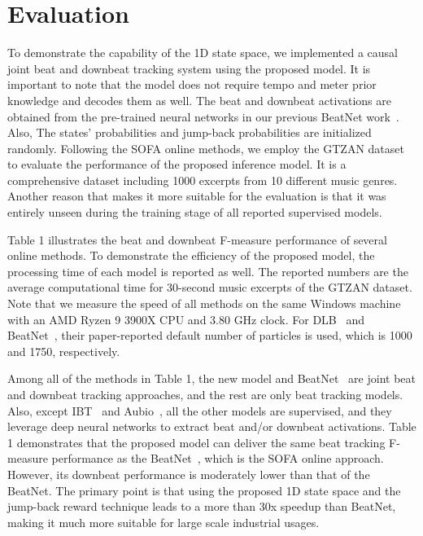 \documentclass{article}
\begin{document}
\section{Evaluation}
\label{sec:pagestyle}

To demonstrate the capability of the 1D state space, we implemented a causal joint beat and downbeat tracking system using the proposed model. It is important to note that the model does not require tempo and meter prior knowledge and decodes them as well. The beat and downbeat activations are obtained from the pre-trained neural networks in our previous BeatNet work~\cite{Heydari:2}. Also, The states' probabilities and jump-back probabilities are initialized randomly. 
Following the SOFA online methods, we employ the GTZAN dataset to evaluate the performance of the proposed inference model. It is a comprehensive dataset including 1000 excerpts from 10 different music genres. Another reason that makes it more suitable for the evaluation is that it was entirely unseen during the training stage of all reported supervised models.  

Table 1 illustrates the beat and downbeat F-measure performance of several online methods. To demonstrate the efficiency of the proposed model, the processing time of each model is reported as well. The reported numbers are the average computational time for 30-second music excerpts of the GTZAN dataset. Note that we measure the speed of all methods on the same Windows machine with an AMD Ryzen 9 3900X CPU and 3.80 GHz clock. For DLB~\cite{Heydari} and BeatNet~\cite{Heydari:2}, their paper-reported default number of particles is used, which is 1000 and 1750, respectively. 

Among all of the methods in Table 1, the new model and BeatNet~\cite{Heydari:2} are joint beat and downbeat tracking approaches, and the rest are only beat tracking models. Also, except IBT~\cite{Oliveria} and Aubio~\cite{Brossier}, all the other models are supervised, and they leverage deep neural networks to extract beat and/or downbeat activations.     
Table 1 demonstrates that the proposed model can deliver the same beat tracking F-measure performance as the BeatNet~\cite{Heydari:2}, which is the SOFA online approach. However, its downbeat performance is moderately lower than that of the BeatNet. The primary point is that using the proposed 1D state space and the jump-back reward technique leads to a more than 30x speedup than BeatNet, making it much more suitable for large scale industrial usages.
\end{document}

